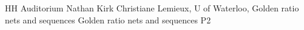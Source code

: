 \tablePlenary{} %
{HH Auditorium}	%
{Nathan Kirk}		%
{Christiane Lemieux, U of Waterloo, Golden ratio nets and sequences}	%
{Golden ratio nets and sequences}		%
{P2}		%
\\\hline
